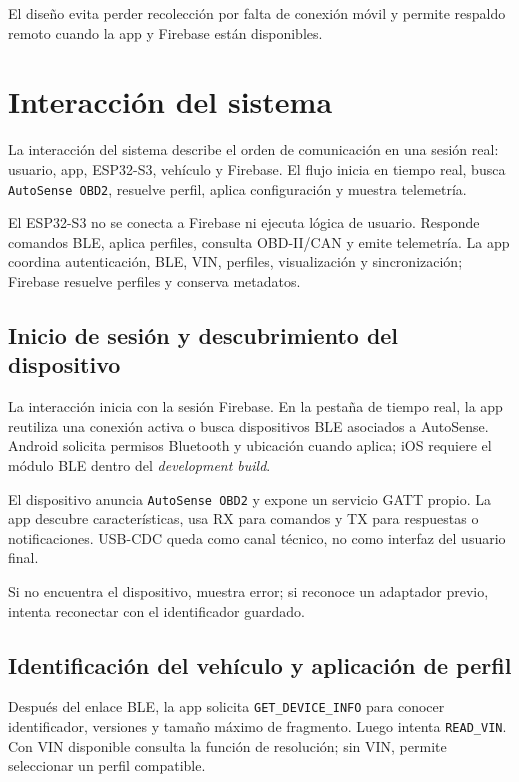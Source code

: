 \documentclass[12pt,letterpaper]{report}
\begin{document}
El diseño evita perder recolección por falta de conexión móvil y permite respaldo remoto cuando la app y Firebase están disponibles.

\section{Interacción del sistema}

La interacción del sistema describe el orden de comunicación en una sesión real: usuario, app, ESP32-S3, vehículo y Firebase. El flujo inicia en tiempo real, busca \texttt{AutoSense OBD2}, resuelve perfil, aplica configuración y muestra telemetría.

El ESP32-S3 no se conecta a Firebase ni ejecuta lógica de usuario. Responde comandos BLE, aplica perfiles, consulta OBD-II/CAN y emite telemetría. La app coordina autenticación, BLE, VIN, perfiles, visualización y sincronización; Firebase resuelve perfiles y conserva metadatos.

\subsection{Inicio de sesión y descubrimiento del dispositivo}

La interacción inicia con la sesión Firebase. En la pestaña de tiempo real, la app reutiliza una conexión activa o busca dispositivos BLE asociados a AutoSense. Android solicita permisos Bluetooth y ubicación cuando aplica; iOS requiere el módulo BLE dentro del \emph{development build}.

El dispositivo anuncia \texttt{AutoSense OBD2} y expone un servicio GATT propio. La app descubre características, usa RX para comandos y TX para respuestas o notificaciones. USB-CDC queda como canal técnico, no como interfaz del usuario final.

Si no encuentra el dispositivo, muestra error; si reconoce un adaptador previo, intenta reconectar con el identificador guardado.

\subsection{Identificación del vehículo y aplicación de perfil}

Después del enlace BLE, la app solicita \texttt{GET\_DEVICE\_INFO} para conocer identificador, versiones y tamaño máximo de fragmento. Luego intenta \texttt{READ\_VIN}. Con VIN disponible consulta la función de resolución; sin VIN, permite seleccionar un perfil compatible.
\end{document}
